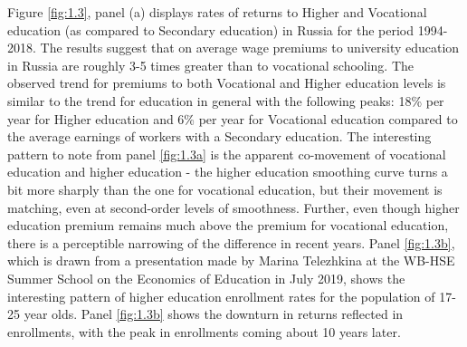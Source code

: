 \documentclass[alpha-refs]{wiley-article-01g}
\begin{document}
Figure \ref{fig:1.3}, panel (a) displays rates of returns to Higher and Vocational education (as compared to Secondary education) in Russia for the period 1994-2018. The results suggest that on average wage premiums to university education in Russia are roughly 3-5 times greater than to vocational schooling. The observed trend for premiums to both Vocational and Higher education levels is similar to the trend for education in general with the following peaks: 18\% per year for Higher education and 6\% per year for Vocational education compared to the average earnings of workers with a Secondary education. The interesting pattern to note from panel \ref{fig:1.3a} is the apparent co-movement of vocational education and higher education - the higher education smoothing curve turns a bit more sharply than the one for vocational education, but their movement is matching, even at second-order levels of smoothness. Further, even though higher education premium remains much above the premium for vocational education, there is a perceptible narrowing of the difference in recent years. Panel \ref{fig:1.3b}, which is drawn from a presentation made by Marina Telezhkina at the WB-HSE Summer School on the Economics of Education in July 2019, shows the interesting pattern of higher education enrollment rates for the population of 17-25 year olds. Panel \ref{fig:1.3b} shows the downturn in returns reflected in enrollments, with the peak in enrollments coming about 10 years later. 
\end{document}
